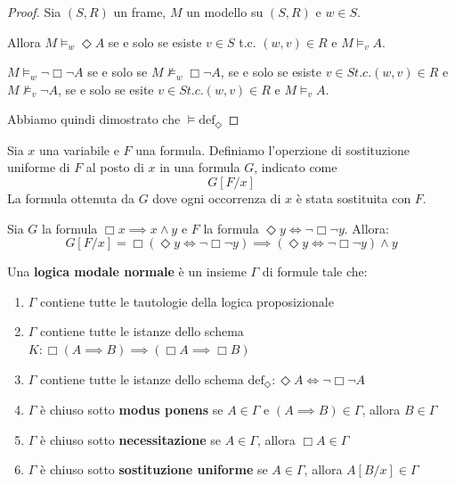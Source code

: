 \documentclass[../main.tex]{subfiles}
\begin{document}
\begin{proof}
    Sia $(S,R)$ un frame, $M$ un modello su $(S,R)$ e $w \in S$.

    Allora $M \vDash_w \Diamond A$ se e solo se esiste $v \in S$ t.c. $(w,v) \in R$ e $M \vDash_v A$.

    $M \vDash_w \neg \Box \neg A$ se e solo se $M \nvDash_w \Box \neg A$, se e solo se esiste $v \in S t.c. (w,v) \in R$ e $M \nvDash_v \neg A$, se e solo se esite $v \in S t.c. (w,v) \in R$ e $M \vDash_v A$.

    Abbiamo quindi dimostrato che $\vDash \text{def}_\Diamond$
\end{proof}
\begin{definition}
    Sia $x$ una variabile e $F$ una formula. Definiamo l'operzione di sostituzione uniforme di $F$ al posto di $x$ in una formula $G$, indicato come
    \begin{equation*}
        G[F/x]
    \end{equation*}
    La formula ottenuta da $G$ dove ogni occorrenza di $x$ è stata sostituita con $F$.
\end{definition}
\begin{example}
    Sia $G$ la formula $\Box x \implies x \land y$ e $F$ la formula $\Diamond y \iff \neg \Box \neg y$. Allora:
    \[
        G[F/x] = \Box (\Diamond y \iff \neg \Box \neg y) \implies (\Diamond y \iff \neg \Box \neg y) \land y
    \]
\end{example}
\begin{definition}
    Una \textbf{logica modale normale} è un insieme $\Gamma$ di formule tale che:
    \begin{enumerate}
        \item $\Gamma$ contiene tutte le tautologie della logica proposizionale
        \item $\Gamma$ contiene tutte le istanze dello schema $K: \Box (A \implies B) \implies (\Box A \implies \Box B)$
        \item $\Gamma$ contiene tutte le istanze dello schema $\text{def}_\Diamond : \Diamond A \iff \neg \Box \neg A$
        \item $\Gamma$ è chiuso sotto \textbf{modus ponens} se $A \in \Gamma$ e $(A \implies B) \in \Gamma$, allora $B \in \Gamma$
        \item $\Gamma$ è chiuso sotto \textbf{necessitazione} se $A \in \Gamma$, allora $\Box A \in \Gamma$
        \item $\Gamma$ è chiuso sotto \textbf{sostituzione uniforme} se $A \in \Gamma$, allora $A[B/x] \in \Gamma$
    \end{enumerate}
\end{definition}
\end{document}
